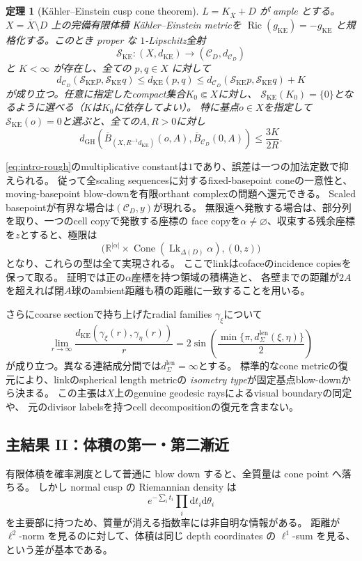 \documentclass[11pt,a4paper]{ltjsarticle}
\newcommand{\RR}{\mathbb R}
\newcommand{\dd}{\mathrm d}
\newcommand{\Ric}{\operatorname{Ric}}
\newcommand{\Cone}{\operatorname{Cone}}
\newcommand{\GH}{\operatorname{GH}}
\newcommand{\Lk}{\operatorname{Lk}}
\newcommand{\cC}{\mathcal C}
\newcommand{\cS}{\mathcal S}
\newcommand{\ov}{\overline}
\theoremstyle{plain}
\newtheorem{theorem}{定理}[section]
\theoremstyle{definition}
\theoremstyle{remark}
\begin{document}
\begin{theorem}[K\"ahler--Einstein cusp cone theorem]
\label{thm:intro-metric}
$L=K_{\ov X}+D$ が ample とする。$X=\ov X\setminus D$ 上の完備有限体積 K\"ahler--Einstein metricを
$\Ric(g_{\mathrm{KE}})=-g_{\mathrm{KE}}$ と規格化する。このとき proper な $1$-Lipschitz全射
\[
 \cS_{\mathrm{KE}}:(X,d_{\mathrm{KE}})\longrightarrow(\cC_D,d_{\cC_D})
\]
と $K<\infty$ が存在し、全ての $p,q\in X$ に対して
\begin{equation}
\label{eq:intro-rough}
 d_{\cC_D}(\cS_{\mathrm{KE}}p,\cS_{\mathrm{KE}}q)
 \le d_{\mathrm{KE}}(p,q)
 \le d_{\cC_D}(\cS_{\mathrm{KE}}p,\cS_{\mathrm{KE}}q)+K
\end{equation}
が成り立つ。任意に指定したcompact集合$K_0\Subset X$に対し、
$\cS_{\mathrm{KE}}(K_0)=\{0\}$となるように選べる（$K$は$K_0$に依存してよい）。
特に基点$o\in X$を指定して$\cS_{\mathrm{KE}}(o)=0$と選ぶと、全ての$A,R>0$に対し
\[
 d_{\GH}\!\left(
 \ov B_{(X,R^{-1}d_{\mathrm{KE}})}(o,A),
 \ov B_{\cC_D}(0,A)
 \right)\le\frac{3K}{2R}.
\]
\end{theorem}

\eqref{eq:intro-rough}のmultiplicative constantは$1$であり、誤差は一つの加法定数で抑えられる。
従って全scaling sequencesに対するfixed-basepoint coneの一意性と、
moving-basepoint blow-downを有限orthant complexの問題へ還元できる。
Scaled basepointが有界な場合は$(\cC_D,y)$が現れる。
無限遠へ発散する場合は、部分列を取り、一つのcell copyで発散する座標の
face copyを$\alpha\ne\varnothing$、収束する残余座標を$z$とすると、極限は
\[
 \bigl(\RR^{|\alpha|}\times\Cone(\Lk_{\Delta(D)}\alpha),(0,z)\bigr)
\]
となり、これらの型は全て実現される。
ここでlinkはcofaceのincidence copiesを保って取る。
証明では正の$\alpha$座標を持つ領域の積構造と、
各壁までの距離が$2A$を超えれば閉$A$球のambient距離も積の距離に一致することを用いる。

さらにcoarse sectionで持ち上げたradial families $\gamma_\xi$について
\[
 \lim_{r\to\infty}\frac{d_{\mathrm{KE}}(\gamma_\xi(r),\gamma_\eta(r))}{r}
 =2\sin\!\left(\frac{\min\{\pi,d_\Sigma^{\mathrm{len}}(\xi,\eta)\}}2\right)
\]
が成り立つ。異なる連結成分間では$d_\Sigma^{\mathrm{len}}=\infty$とする。
標準的なcone metricの復元により、linkのspherical length metricの
\emph{isometry type}が固定基点blow-downから決まる。
この主張は$X$上のgenuine geodesic raysによるvisual boundaryの同定や、
元のdivisor labelsを持つcell decompositionの復元を含まない。

\subsection{主結果 II：体積の第一・第二漸近}
有限体積を確率測度として普通に blow down すると、全質量は cone point へ落ちる。
しかし normal cusp の Riemannian density は
\[
 e^{-\sum_i t_i}\prod_i\dd t_i\dd\theta_i
\]
を主要部に持つため、質量が消える指数率には非自明な情報がある。
距離が $\ell^2$-norm を見るのに対して、体積は同じ depth coordinates の $\ell^1$-sum を見る、という差が基本である。
\end{document}

